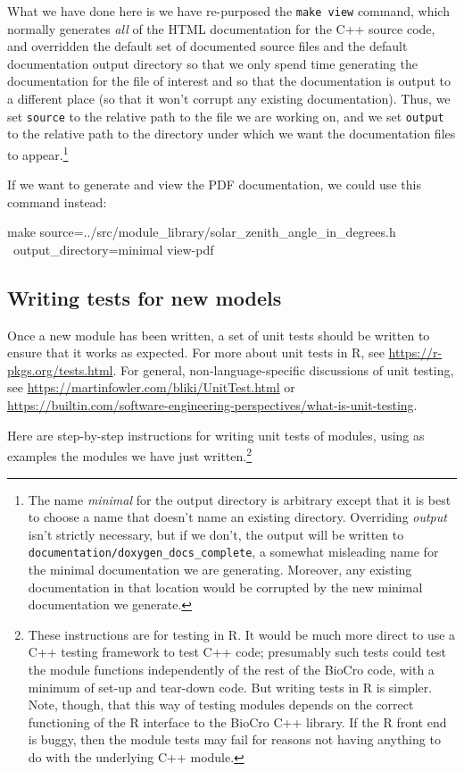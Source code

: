 \documentclass{article}\usepackage[]{graphicx}\usepackage[]{color}
\newcommand{\code}[1]{\lstinline[style=C++style]{#1}}
\begin{document}
What we have done here is we have re-purposed the \code{make view}
command, which normally generates \emph{all} of the HTML documentation
for the C++ source code, and overridden the default set of documented
source files and the default documentation output directory so that we
only spend time generating the documentation for the file of interest
and so that the documentation is output to a different place (so that
it won't corrupt any existing documentation).  Thus, we set
\code{source} to the relative path to the file we are working on, and
we set \code{output} to the relative path to the directory under which
we want the documentation files to appear.\footnote{The name
\emph{minimal} for the output directory is arbitrary except that it is
best to choose a name that doesn't name an existing directory.
Overriding \emph{output} isn't strictly necessary, but if we don't,
the output will be written to
\code{documentation/doxygen_docs_complete}, a somewhat misleading name
for the minimal documentation we are generating.  Moreover, any
existing documentation in that location would be corrupted by the new
minimal documentation we generate.}

If we want to generate and view the PDF documentation, we could use
this command instead:
\begin{sh_listing}[2]
  make source=../src/module_library/solar_zenith_angle_in_degrees.h \
       output_directory=minimal view-pdf
\end{sh_listing}

\subsection{Writing tests for new models}
\label{sec:writing_tests}

Once a new module has been written, a set of unit tests should be
written to ensure that it works as expected.  For more about unit
tests in R, see \url{https://r-pkgs.org/tests.html}.  For general,
non-language-specific discussions of unit testing, see
\url{https://martinfowler.com/bliki/UnitTest.html} or
\url{https://builtin.com/software-engineering-perspectives/what-is-unit-testing}.


Here are step-by-step instructions for writing unit tests of modules,
using as examples the modules we have just written.\footnote{These
instructions are for testing in R.  It would be much more direct to
use a C++ testing framework to test C++ code; presumably such tests
could test the module functions independently of the rest of the
BioCro code, with a minimum of set-up and tear-down code.  But writing
tests in R is simpler.  Note, though, that this way of testing modules
depends on the correct functioning of the R interface to the BioCro
C++ library.  If the R front end is buggy, then the module tests may
fail for reasons not having anything to do with the underlying C++
module.}
\end{document}
